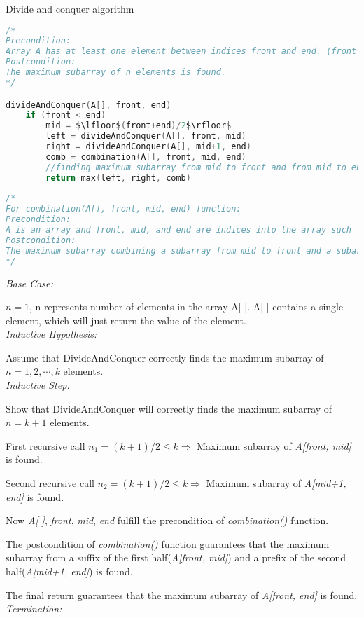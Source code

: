 \documentclass[11pt]{scrreprt}
\begin{document}
Divide and conquer algorithm

\begin{lstlisting}[language=c,mathescape=true]
/*
Precondition: 
Array A has at least one element between indices front and end. (front < end)
Postcondition: 
The maximum subarray of n elements is found. 
*/

divideAndConquer(A[], front, end)
	if (front < end)
		mid = $\lfloor$(front+end)/2$\rfloor$
		left = divideAndConquer(A[], front, mid)
		right = divideAndConquer(A[], mid+1, end)
		comb = combination(A[], front, mid, end)		
		//finding maximum subarray from mid to front and from mid to end.
		return max(left, right, comb)
		
/*
For combination(A[], front, mid, end) function:
Precondition: 
A is an array and front, mid, and end are indices into the array such that front <= mid < end.
Postcondition: 
The maximum subarray combining a subarray from mid to front and a subarray from mid to end is found.
*/
\end{lstlisting}
\emph{Base Case:} 

$n = 1$, n represents number of elements in the array A[ ]. A[ ] contains a single element, which will just return the value of the element. \\
\emph{Inductive Hypothesis:} 

Assume that DivideAndConquer correctly finds the maximum subarray of $n=1, 2,\cdots, k$ elements. \\
\emph{Inductive Step:} 

Show that DivideAndConquer will correctly finds the maximum subarray of $n= k+1$ elements. 

First recursive call $n_1=(k+1)/2\leq k\Rightarrow $ Maximum subarray of \textit{A[front, mid]} is found.

Second recursive call $n_2=(k+1)/2 \leq k \Rightarrow$ Maximum subarray of \textit{A[mid+1, end]} is found.

Now \textit{A[ ]}, \textit{front}, \textit{mid}, \textit{end} fulfill the precondition of \textit{combination()} function.

The postcondition of \textit{combination()} function guarantees that the maximum subarray from a suffix of the first half(\textit{A[front, mid]}) and a prefix of the second half(\textit{A[mid+1, end]}) is found.

The final return guarantees that the maximum subarray of \textit{A[front, end]} is found. \\
\emph{Termination:}
\end{document}
